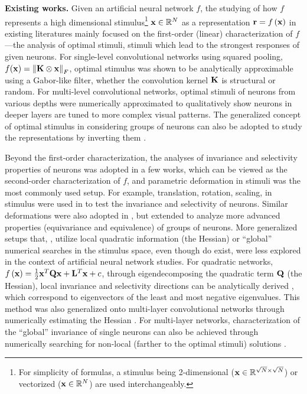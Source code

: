 \documentclass[10pt,twocolumn,letterpaper]{article}
\begin{document}
\newcommand{\expstimdim}{For simplicity of formulas, a stimulus being 2-dimensional (\ie ${\bf{x}} \in \mathbb{R}^{\sqrt{N} \times \sqrt{N}}$) or vectorized (\ie ${\bf{x}} \in \mathbb{R}^N$) are used interchangeably.}

{\bf Existing works.} 
Given an artificial neural network $f$, the studying of how $f$ represents a high dimensional stimulus\footnote{\expstimdim} ${\bf{x}} \in \mathbb{R}^N$ as a representation 
${\bf{r}} = f\left( {\bf{x}} \right)$ in existing literatures mainly focused on the first-order (\ie linear) characterization of $f$---the analysis of optimal stimuli, stimuli which lead to the strongest responses of given neurons.
For single-level convolutional networks using squared pooling, \ie $f({\bf{x}}) = \left\| {\bf{K}} \otimes {\bf{x}} \right\|_{F}$, optimal stimulus was shown to be analytically approximable \cite{saxe2011random} using a Gabor-like filter, whether the convolution kernel $\bf{K}$ is structural or random.
For multi-level convolutional networks, optimal stimuli of neurons from various depths were numerically approximated \cite{ngiam2010tiled, le2012building, zeiler2014visualizing, simonyan2013deep} to qualitatively show neurons in deeper layers are tuned to more complex visual patterns.
The generalized concept of optimal stimulus in considering groups of neurons can also be adopted to study the representations by inverting them \cite{mahendran2014understanding}.

Beyond the first-order characterization, the analyses of invariance and selectivity properties of neurons was adopted in a few works, which can be viewed as the second-order characterization of $f$, and parametric deformation in stimuli was the most commonly used setup.
For example, translation, rotation, scaling, \etc in stimulus were used in \cite{goodfellow2009measuring, zeiler2014visualizing} to test the invariance and selectivity of neurons.
Similar deformations were also adopted in \cite{lenc2014understanding}, but extended to analyze more advanced properties (\ie equivariance and equivalence) of groups of neurons.
More generalized setups that, \eg, utilize local quadratic information (\ie the Hessian) or ``global'' numerical searches in the stimulus space, even though do exist, were less explored in the context of artificial neural network studies.
For quadratic networks, \ie $f\left({\bf{x}}\right) = \frac{1}{2}{\bf{x}}^{T}{\bf{Qx}}+{\bf{L}}^{T}{\bf{x}}+c$, through eigendecomposing the quadratic term $\bf{Q}$ (\ie the Hessian), local invariance and selectivity directions can be analytically derived \cite{berkes2006analysis}, which correspond to eigenvectors of the least and most negative eigenvalues.
This method was also generalized onto multi-layer convolutional networks through numerically estimating the Hessian \cite{ngiam2010tiled}.
For multi-layer networks, characterization of the ``global'' invariance of single neurons can also be achieved through numerically searching for non-local (\ie farther to the optimal stimuli) solutions \cite{erhan2010understanding}.
\end{document}
